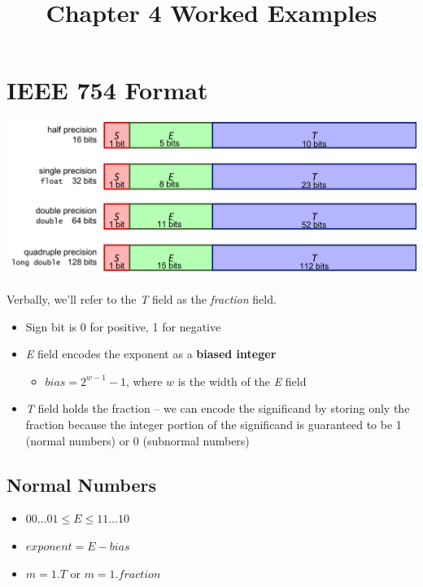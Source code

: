 \documentclass{article}
\begin{document}
\title{Chapter 4 Worked Examples}
\date{}
\maketitle

\section{IEEE 754 Format}

\includegraphics[width=\textwidth]{754-precisions.png}

\vspace{1cm}

Verbally, we'll refer to the \textit{T} field as the \textit{fraction} field.

\begin{itemize}
\item Sign bit is 0 for positive, 1 for negative
\item \textit{E} field encodes the exponent as a \textbf{biased integer}
    \begin{itemize}
    \item $bias = 2^{w-1} - 1$, where $w$ is the width of the \textit{E} field
    \end{itemize}
\item \textit{T} field holds the fraction -- we can encode the significand by
    storing only the fraction because the integer portion of the significand is
    guaranteed to be 1 (normal numbers) or 0 (subnormal numbers)
\end{itemize}

\subsection{Normal Numbers}

\begin{itemize}
\item $00\dots01 \leq E \leq 11\dots10$
\item $exponent = E - bias$
\item $m = 1.T$ or $m = 1.fraction$
\end{itemize}
\end{document}
